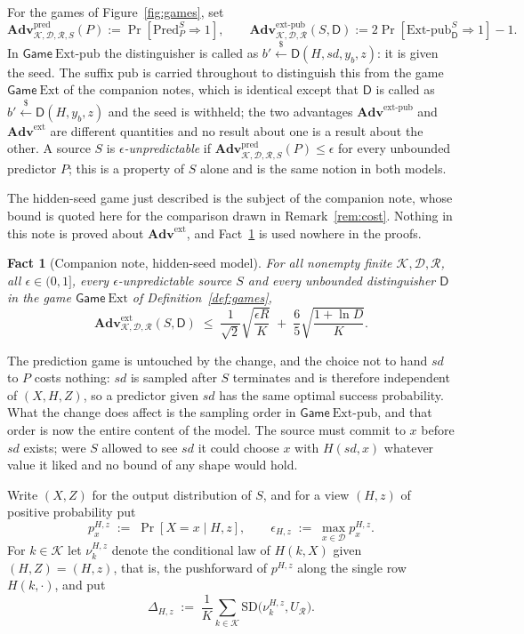 \documentclass{conjura-solution}
\newcommand{\Adv}{\mathbf{Adv}}
\newcommand{\Gm}{\mathsf{Game}}
\newcommand{\Pred}{\mathrm{Pred}}
\newcommand{\Ext}{\mathrm{Ext}}
\newcommand{\Extp}{\mathrm{Ext}\text{-}\mathrm{pub}}
\newcommand{\pred}{\mathrm{pred}}
\newcommand{\ext}{\mathrm{ext}}
\newcommand{\extp}{\mathrm{ext}\text{-}\mathrm{pub}}
\newcommand{\sd}{\mathit{sd}}
\renewcommand{\sample}{\stackrel{{\scriptscriptstyle\$}}{\leftarrow}}
\newcommand{\SD}{\mathrm{SD}}
\newcommand{\calK}{\mathcal{K}}
\newcommand{\calD}{\mathcal{D}}
\newcommand{\calR}{\mathcal{R}}
\newtheorem{fact}{Fact}
\begin{document}
\begin{definition}\label{def:games}
For the games of Figure~\ref{fig:games}, set
\[
  \Adv^{\pred}_{\calK,\calD,\calR,S}(P) := \Pr[\Pred^{S}_{P} \Rightarrow 1] ,
  \qquad
  \Adv^{\extp}_{\calK,\calD,\calR}(S,\mathsf{D}) := 2\Pr[\Extp^{S}_{\mathsf{D}} \Rightarrow 1] - 1 .
\]
In $\Gm\ \Extp$ the distinguisher is called as $b' \sample \mathsf{D}(H, \sd, y_b, z)$: it is
given the seed. The suffix
$\mathrm{pub}$ is carried throughout to distinguish this from the game $\Gm\ \Ext$ of the
companion notes, which is identical except that $\mathsf{D}$ is called as
$b' \sample \mathsf{D}(H, y_b, z)$ and the seed is withheld; the two advantages
$\Adv^{\extp}$ and $\Adv^{\ext}$ are different quantities and no result about one is a result
about the other. A source $S$ is \emph{$\epsilon$-unpredictable} if
$\Adv^{\pred}_{\calK,\calD,\calR,S}(P) \le \epsilon$ for every unbounded predictor $P$; this is a
property of $S$ alone and is the same notion in both models.
\end{definition}

The hidden-seed game just described is the subject of the companion note, whose bound is quoted
here for the comparison drawn in Remark~\ref{rem:cost}. Nothing in this note is proved about
$\Adv^{\ext}$, and Fact~\ref{fact:hidden} is used nowhere in the proofs.

\begin{fact}[Companion note, hidden-seed model]\label{fact:hidden}
For all nonempty finite $\calK, \calD, \calR$, all $\epsilon \in (0,1]$, every
$\epsilon$-unpredictable source $S$ and every unbounded distinguisher $\mathsf{D}$ in the game
$\Gm\ \Ext$ of Definition~\ref{def:games},
\[
  \Adv^{\ext}_{\calK,\calD,\calR}(S,\mathsf{D})
  \;\le\; \frac{1}{\sqrt{2}}\sqrt{\frac{\epsilon R}{K}}
       \;+\; \frac{6}{5}\sqrt{\frac{1 + \ln D}{K}} .
\]
\end{fact}

The prediction game is untouched by the change, and the choice not to hand $\sd$ to $P$ costs
nothing: $\sd$ is sampled after $S$ terminates and is therefore independent of $(X,H,Z)$, so a
predictor given $\sd$ has the same optimal success probability. What the change does affect is
the sampling order in $\Gm\ \Extp$, and that order is now the entire content of the model. The
source must commit to $x$ before $\sd$ exists; were $S$ allowed to see $\sd$ it could choose $x$
with $H(\sd,x)$ whatever value it liked and no bound of any shape would hold.

Write $(X,Z)$ for the output distribution of $S$, and for a view $(H,z)$ of positive probability put
\[
  p^{H,z}_{x} \;:=\; \Pr[X = x \mid H, z] ,
  \qquad
  \epsilon_{H,z} \;:=\; \max_{x \in \calD} p^{H,z}_{x} .
\]
For $k \in \calK$ let $\nu^{H,z}_{k}$ denote the conditional law of $H(k, X)$ given $(H,Z) = (H,z)$,
that is, the pushforward of $p^{H,z}$ along the single row $H(k,\cdot)$, and put
\[
  \Delta_{H,z} \;:=\; \frac{1}{K}\sum_{k \in \calK} \SD\bigl(\nu^{H,z}_{k}, U_{\calR}\bigr).
\]
\end{document}
